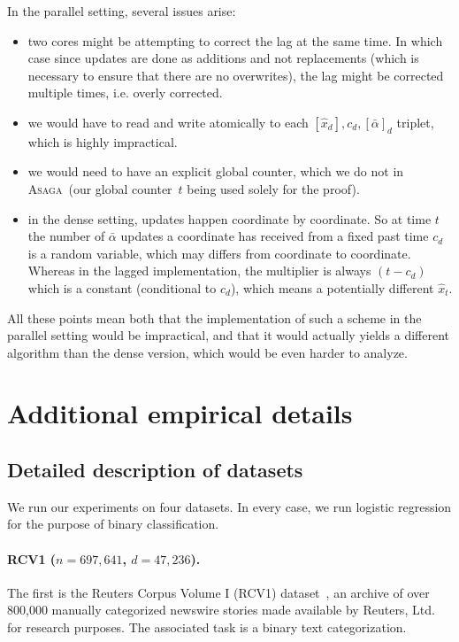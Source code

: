\documentclass[twoside]{article}
\newcommand{\ASAGA}{\textsc{Asaga}}
\begin{document}
In the parallel setting, several issues arise:
\begin{itemize}
\item two cores might be attempting to correct the lag at the same time. 
In which case since updates are done as additions and not replacements (which is necessary to ensure that there are no overwrites), the lag might be corrected multiple times, i.e. overly corrected. 
\item we would have to read and write atomically to each $[\hat x_d], c_d, [\bar \alpha]_d$ triplet, which is highly impractical.
\item we would need to have an explicit global counter, which we do not in \ASAGA\ (our global counter~$t$ being used solely for the proof).
\item in the dense setting, updates happen coordinate by coordinate. 
So at time $t$ the number of $\bar \alpha$ updates a coordinate has received from a fixed past time $c_d$ is a random variable, which may differs from coordinate to coordinate. 
Whereas in the lagged implementation, the multiplier is always $(t-c_d)$ which is a constant (conditional to $c_d$), which means a potentially different $\hat x_t$.
\end{itemize}

All these points mean both that the implementation of such a scheme in the parallel setting would be impractical, and that it would actually yields a different algorithm than the dense version, which would be even harder to analyze.


\section{Additional empirical details} \label{apxE}
\subsection{Detailed description of datasets}
We run our experiments on four datasets. In every case, we run logistic regression for the purpose of binary classification.

\paragraph{RCV1 ($n=697,641$, $d=47,236$).}
The first is the Reuters Corpus Volume I (RCV1) dataset~\citep{RCV1}, an archive of over 800,000 manually categorized newswire stories made available by Reuters, Ltd. for research purposes. 
The associated task is a binary text categorization.
\end{document}
